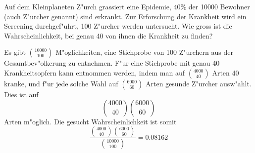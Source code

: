 Auf dem Kleinplaneten Z"urch grassiert eine Epidemie, 40\% der 10000 Bewohner
(auch Z"urcher genannt) sind
erkrankt. Zur Erforschung der Krankheit wird ein Screening durchgef"uhrt,
100 Z"urcher werden untersucht. Wie gross ist die Wahrscheinlichkeit,
bei genau 40 von ihnen die Krankheit zu finden?

\begin{loesung}
Es gibt $\binom{10000}{100}$ M"oglichkeiten, eine Stichprobe von
100 Z"urchern aus der Gesamtbev"olkerung zu entnehmen. F"ur eine
Stichprobe mit genau 40 Krankheitsopfern kann entnommen
werden, indem man auf
$\binom{4000}{40}$ Arten 40 kranke, und f"ur jede solche Wahl
auf $\binom{6000}{60}$ Arten
gesunde Z"urcher ausw"ahlt. Dies ist auf
\[
\binom{4000}{40}\binom{6000}{60}
\]
Arten m"oglich.
Die gesucht Wahrscheinlichkeit ist somit
\[
\frac{\binom{4000}{40}\binom{6000}{60}}{\binom{10000}{100}}=
0.08162
\]
\end{loesung}

